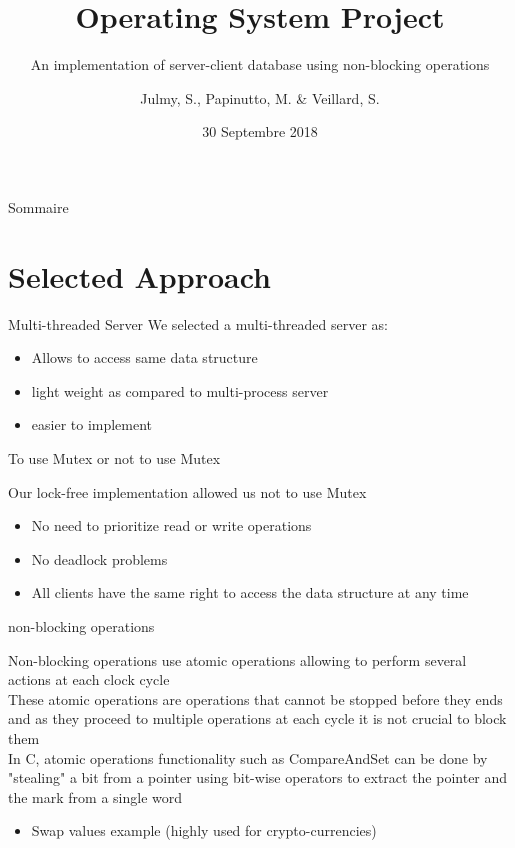 \documentclass{bredelebeamer}
\title[OS Project]{Operating System Project}
\subtitle{An implementation of server-client database using non-blocking operations}
\author{Julmy, S., Papinutto, M. \& Veillard, S.}
\institute[UniFr]{}
\date{30 Septembre 2018}
\begin{document}
    \begin{frame}
        \titlepage
    \end{frame}

    \begin{frame}{Sommaire}
        \tableofcontents
    \end{frame}

    \section{Selected Approach}

    \begin{frame}{Multi-threaded Server}
        We selected a multi-threaded server as: \\
        \begin{itemize}
            \item Allows to access same data structure
            \item light weight as compared to multi-process server
            \item easier to implement
        \end{itemize}
    \end{frame}

     \begin{frame}{To use Mutex or not to use Mutex}

         Our lock-free implementation allowed us not to use Mutex \\

        \begin{itemize}
            \item No need to prioritize read or write operations
            \item No deadlock problems
            \item All clients have the same right to access the data structure at any time
        \end{itemize}
    \end{frame}

     \begin{frame}{non-blocking operations}

        Non-blocking operations use atomic operations allowing to perform several actions at each clock cycle\\
        These atomic operations are operations that cannot be stopped before they ends and as they proceed to multiple
        operations at each cycle it is not crucial to block them \\
        In C, atomic operations functionality such as CompareAndSet can be done by "stealing" a bit from a pointer
        using bit-wise operators to extract the pointer and the mark from a single word \\

        \begin{itemize}
            \item Swap values example (highly used for crypto-currencies)
        \end{itemize}
    \end{frame}
\end{document}
